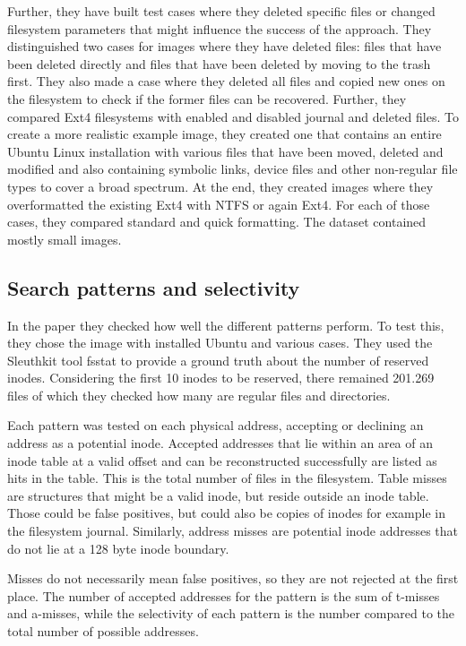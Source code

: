 \documentclass{acm_proc_article-sp}
\begin{document}
Further, they have built test cases where they deleted specific files or changed filesystem parameters that might influence the success of the approach.
They distinguished two cases for images where they have deleted files: files that have been deleted directly and files that have been deleted by moving to the trash first.
They also made a case where they deleted all files and copied new ones on the filesystem to check if the former files can be recovered.
Further, they compared Ext4 filesystems with enabled and
disabled journal and deleted files. To create a more realistic
example image, they created one that contains an entire Ubuntu
Linux installation with various files that have been moved, deleted
and modified and also containing symbolic links, device files and
other non-regular file types to cover a broad spectrum.
At the end, they created images where they overformatted the existing Ext4 with NTFS or again Ext4. For each of those cases, they compared standard and quick formatting. The dataset contained mostly small images.

\subsection{Search patterns and selectivity}

In the paper they checked how well the different patterns perform. 
To test this, they chose the image with installed Ubuntu and various cases. They used the Sleuthkit tool fsstat to provide a ground truth about the number of reserved inodes.
Considering the first 10 inodes to be reserved, there remained 201.269 files of which they checked how many are regular files and directories.

Each pattern was tested on each physical address, accepting or declining an address as a potential inode. Accepted addresses that lie within an area of an inode table at a valid offset and can be reconstructed successfully are listed as hits in the table. This is the total number of files in the filesystem. Table misses are structures that might be a valid inode, but reside outside an inode table. Those could be false positives, but could also be copies of inodes for example in the filesystem journal. Similarly, address misses are potential inode addresses that do not lie at a 128 byte inode boundary.

Misses do not necessarily mean false positives, so they are not rejected at the first place. The number of accepted addresses for the pattern is the sum of t-misses and a-misses, while the selectivity of each pattern is the number compared to the total number of possible addresses.
\end{document}

